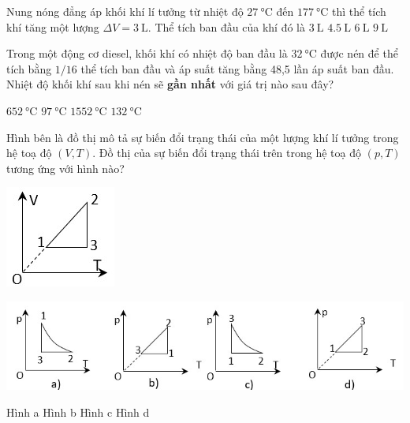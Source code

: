 \begin{ex}
Nung nóng đẳng áp khối khí lí tưởng từ nhiệt độ $\SI{27}{\celsius}$ đến $\SI{177}{\celsius}$ thì thể tích khí tăng một lượng $\Delta V=\SI{3}{\liter}$. Thể tích ban đầu của khí đó là	
	\choice
	{$\SI{3}{\liter}$}
	{$\SI{4.5}{\liter}$}
	{\True $\SI{6}{\liter}$}
	{$\SI{9}{\liter}$}
\end{ex}
\begin{ex}
Trong một động cơ diesel, khối khí có nhiệt độ ban đầu là $\SI{32}{\celsius}$ được nén để thể tích bằng $1/16$ thể tích ban đầu và áp suất tăng bằng 48,5 lần áp suất ban đầu. Nhiệt độ khối khí sau khi nén sẽ \textbf{gần nhất} với giá trị nào sau đây?
	
	\choice
	{\True $\SI{652}{\celsius}$}
	{$\SI{97}{\celsius}$}
	{$\SI{1552}{\celsius}$}
	{$\SI{132}{\celsius}$}
\end{ex}
\begin{ex}
Hình bên là đồ thị mô tả sự biến đổi trạng thái của một lượng khí lí tưởng trong hệ toạ độ $\left(V, T\right)$. Đồ thị của sự biến đổi trạng thái trên trong hệ toạ độ $\left(p, T\right)$ tương ứng với hình nào?
\begin{center}
	\includegraphics[width=0.2\linewidth]{figs/VN12-Y24-PH-SYL-016-7}
\end{center}
\begin{center}
	\includegraphics[width=0.9\linewidth]{figs/VN12-Y24-PH-SYL-016-8}
\end{center}
	
	\choice
	{Hình a}
	{Hình b}
	{Hình c}
	{\True Hình d}
	\loigiai{}
\end{ex}
